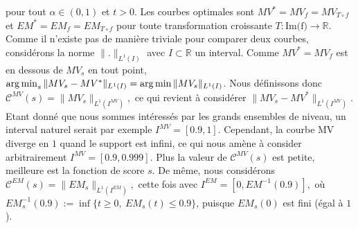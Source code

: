 \documentclass[a4paper, 12pt]{article}
\newcommand{\crit}{\mathcal{C}}
\def\rset{\mathbb{R}}
\def\crit{\mathcal{C}}
\def\argmin{\operatornamewithlimits{arg\,min}}
\begin{document}
pour tout $\alpha\in (0,1)$ et $t >0$.
%
Les courbes optimales sont $MV^* = MV_f = MV_{T \circ f}$ et $EM^* = EM_f = EM_{T \circ f}$ pour toute transformation croissante $T: \text{Im(f)} \to \mathbb{R}$.
%
Comme il n'existe pas de manière triviale pour comparer deux courbes, considérons la norme $\|.\|_{L^1(I)}$ avec $I\subset \rset$ un interval. Comme $MV^*=MV_f$ est en dessous de $MV_s$ en tout point, $\argmin_s \| MV_s - MV^* \|_{L^1(I)} = \argmin \| MV_s \|_{L^1(I)} $. Nous définissons donc
$\crit^{MV}(s) = \| MV_s \|_{L^1(I^{MV})},$ ce qui revient à considérer $\| MV_s - MV^* \|_{L^1(I^{MV})}$. %
Etant donné que nous sommes intéressés par les grands ensembles de niveau, un interval naturel serait par exemple $I^{MV} = [0.9, 1]$. Cependant, la courbe MV diverge en $1$ quand le support est infini, ce qui nous amène à consider arbitrairement $I^{MV} = [0.9, 0.999].$
Plus la valeur de $\crit^{MV}(s)$ est petite, meilleure est la fonction de score $s$.
%
De même, nous considérons $\crit^{EM}(s) = \|EM_s\|_{L^1(I^{EM})},$ cette fois avec $I^{EM} = [0,EM^{-1}(0.9)],$ où $EM_s^{-1}(0.9) := \inf\{t\ge 0,~ EM_s(t) \le 0.9\}$, puisque $EM_s(0)$ est fini (égal à $1$). 

\end{document}

